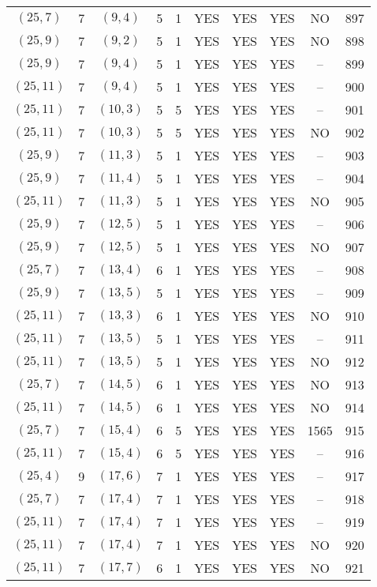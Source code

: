 \begin{longtable}{|c|c|c|c|c|c|c|c|c|c|}
$(25, 7)$ & 7 & $(9, 4)$ & 5 & 1 & YES & YES & YES & NO & 897\\
$(25, 9)$ & 7 & $(9, 2)$ & 5 & 1 & YES & YES & YES & NO & 898\\
$(25, 9)$ & 7 & $(9, 4)$ & 5 & 1 & YES & YES & YES & -- & 899\\
$(25, 11)$ & 7 & $(9, 4)$ & 5 & 1 & YES & YES & YES & -- & 900\\
$(25, 11)$ & 7 & $(10, 3)$ & 5 & 5 & YES & YES & YES & -- & 901\\
$(25, 11)$ & 7 & $(10, 3)$ & 5 & 5 & YES & YES & YES & NO & 902\\
$(25, 9)$ & 7 & $(11, 3)$ & 5 & 1 & YES & YES & YES & -- & 903\\
$(25, 9)$ & 7 & $(11, 4)$ & 5 & 1 & YES & YES & YES & -- & 904\\
$(25, 11)$ & 7 & $(11, 3)$ & 5 & 1 & YES & YES & YES & NO & 905\\
$(25, 9)$ & 7 & $(12, 5)$ & 5 & 1 & YES & YES & YES & -- & 906\\
$(25, 9)$ & 7 & $(12, 5)$ & 5 & 1 & YES & YES & YES & NO & 907\\
$(25, 7)$ & 7 & $(13, 4)$ & 6 & 1 & YES & YES & YES & -- & 908\\
$(25, 9)$ & 7 & $(13, 5)$ & 5 & 1 & YES & YES & YES & -- & 909\\
$(25, 11)$ & 7 & $(13, 3)$ & 6 & 1 & YES & YES & YES & NO & 910\\
$(25, 11)$ & 7 & $(13, 5)$ & 5 & 1 & YES & YES & YES & -- & 911\\
$(25, 11)$ & 7 & $(13, 5)$ & 5 & 1 & YES & YES & YES & NO & 912\\
$(25, 7)$ & 7 & $(14, 5)$ & 6 & 1 & YES & YES & YES & NO & 913\\
$(25, 11)$ & 7 & $(14, 5)$ & 6 & 1 & YES & YES & YES & NO & 914\\
$(25, 7)$ & 7 & $(15, 4)$ & 6 & 5 & YES & YES & YES & 1565 & 915\\
$(25, 11)$ & 7 & $(15, 4)$ & 6 & 5 & YES & YES & YES & -- & 916\\
$(25, 4)$ & 9 & $(17, 6)$ & 7 & 1 & YES & YES & YES & -- & 917\\
$(25, 7)$ & 7 & $(17, 4)$ & 7 & 1 & YES & YES & YES & -- & 918\\
$(25, 11)$ & 7 & $(17, 4)$ & 7 & 1 & YES & YES & YES & -- & 919\\
$(25, 11)$ & 7 & $(17, 4)$ & 7 & 1 & YES & YES & YES & NO & 920\\
$(25, 11)$ & 7 & $(17, 7)$ & 6 & 1 & YES & YES & YES & NO & 921\\

\end{longtable}
